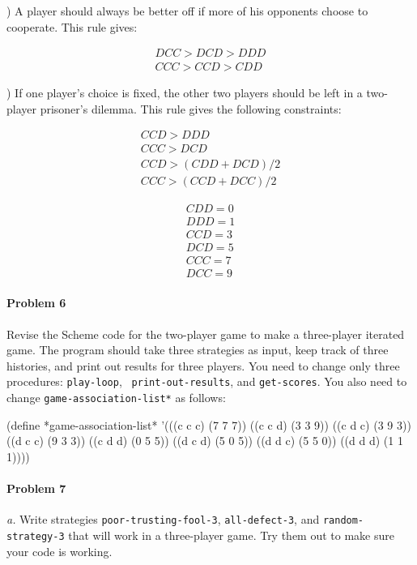 ) A player should always be better off if more of his
opponents choose to cooperate. This rule gives:

\begin{eqnarray*}
DCC > DCD > DDD \\
CCC > CCD > CDD
\end{eqnarray*}

) If one player's choice is fixed, the other two players should be
left in a two-player prisoner's dilemma. This rule gives the following
constraints:

\begin{eqnarray*}
CCD > DDD \\
CCC > DCD \\
CCD > (CDD + DCD) / 2 \\
CCC > (CCD + DCC) / 2
\end{eqnarray*}

\begin{eqnarray*}
CDD = 0 \\
DDD = 1 \\
CCD = 3 \\
DCD = 5 \\
CCC = 7 \\
DCC = 9
\end{eqnarray*}

\paragraph{Problem 6}
Revise the Scheme code for the two-player game to make a three-player
iterated game. The program should take three strategies as input, keep
track of three histories, and print out results for three players. You
need to change only three procedures: {\tt play-loop}, {\tt
print-out-results}, and {\tt get-scores}. You also need to change
{\tt *game-association-list*} as follows:

\beginlisp
(define *game-association-list*
  '(((c c c) (7 7 7))
    ((c c d) (3 3 9))
    ((c d c) (3 9 3))
    ((d c c) (9 3 3))
    ((c d d) (0 5 5))
    ((d c d) (5 0 5))
    ((d d c) (5 5 0))
    ((d d d) (1 1 1))))
\endlisp

\paragraph{Problem 7}
{\it a.} Write strategies {\tt poor-trusting-fool-3}, {\tt all-defect-3}, and
{\tt random-strategy-3} that will work in a three-player game. Try
them out to make sure your code is working.


